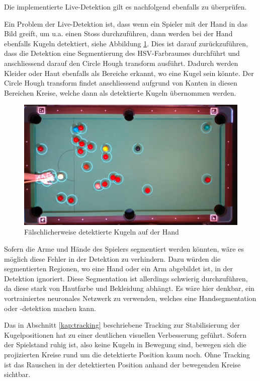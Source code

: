 Die implementierte Live-Detektion gilt es nachfolgend ebenfalls zu überprüfen.

Ein Problem der Live-Detektion ist, dass wenn ein Spieler mit der Hand in das Bild greift, um u.a. einen Stoss
durchzuführen, dann werden bei der Hand ebenfalls Kugeln detektiert, siehe Abbildung \ref{fig:detection_hand_problem}.
Dies ist darauf zurückzuführen, dass die Detektion eine Segmentierung des HSV-Farbraumes durchführt\cite{project2:snooker_detection}
und anschliessend darauf den Circle Hough transform\cite{wiki:circle_hough} ausführt.
Dadurch werden Kleider oder Haut ebenfalls als Bereiche erkannt, wo eine Kugel sein könnte. Der Circle Hough transform
findet anschliessend aufgrund von Kanten in diesen Bereichen Kreise, welche dann als detektierte Kugeln übernommen werden.

\begin{figure}[h!]
    \begin{center}
        \includegraphics[width=0.8\linewidth]{../common/04_results/resources/detektierte_kugeln_auf_der_hand.png}
    \end{center}
    \caption{Fälschlicherweise detektierte Kugeln auf der Hand}
    \label{fig:detection_hand_problem}
\end{figure}

Sofern die Arme und Hände des Spielers segmentiert werden könnten, wäre es möglich diese Fehler in der Detektion zu verhindern.
Dazu würden die segmentierten Regionen, wo eine Hand oder ein Arm abgebildet ist, in der Detektion ignoriert.
Diese Segmentation ist allerdings schwierig durchzuführen, da diese stark von Hautfarbe und Bekleidung abhängt.
Es wäre hier denkbar, ein vortrainiertes neuronales Netzwerk zu verwenden, welches eine Handsegmentation oder -detektion machen kann.

Das in Abschnitt \ref{kap:tracking} beschriebene Tracking zur Stabilisierung der Kugelpositionen hat zu einer deutlichen
visuellen Verbesserung geführt.
Sofern der Spielstand ruhig ist, also keine Kugeln in Bewegung sind, bewegen sich die
projizierten Kreise rund um die detektierte Position kaum noch.
Ohne Tracking ist das Rauschen in der detektierten Position anhand der bewegenden Kreise sichtbar.

